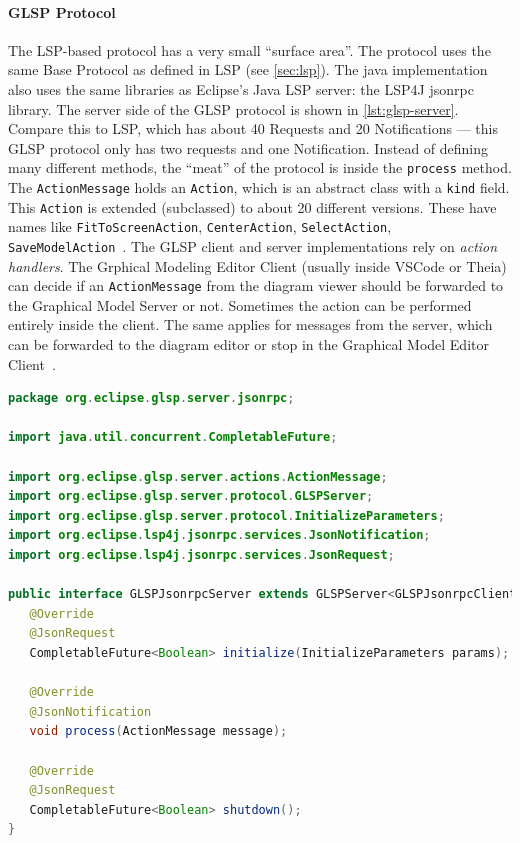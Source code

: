 \paragraph{GLSP Protocol}\label{par:glsp-actionmessage}
The \acrshort{LSP}-based protocol has a very small ``surface area''.
The protocol uses the same Base Protocol as defined in \acrshort{LSP} (see \cref{sec:lsp}).
The java implementation also uses the same libraries as Eclipse's Java \acrshort{LSP} server: the LSP4J jsonrpc library.
The server side of the GLSP protocol is shown in \cref{lst:glsp-server}.
Compare this to \acrshort{LSP}, which has about 40 Requests and 20 Notifications --- this GLSP protocol only has two requests and one Notification.
Instead of defining many different methods, the ``meat'' of the protocol is inside the \texttt{process} method.
The \texttt{ActionMessage} holds an \texttt{Action}, which is an abstract class with a \texttt{kind} field.
This \texttt{Action} is extended (subclassed) to about 20 different versions.
These have names like \texttt{FitToScreenAction}, \texttt{CenterAction}, \texttt{SelectAction}, \texttt{SaveModelAction}~\cite{tobiasortmayrEclipseglspGlspserverActions2021}.
The GLSP client and server implementations rely on \textit{action handlers}.
The Grphical Modeling Editor Client (usually inside \gls{VSCode} or \gls{Theia}) can decide if an \texttt{ActionMessage} from the diagram viewer should be forwarded to the Graphical Model Server or not.
Sometimes the action can be performed entirely inside the client.
The same applies for messages from the server, which can be forwarded to the diagram editor or stop in the Graphical Model Editor Client~\cite{tobiasortmayrEclipseglspGlspvscodeintegration2021}.

\begin{lstlisting}[language=java, label={lst:glsp-server}, caption={[GLSP Server Interface]GLSP Server java interface. Copied from \cite{philiplangerEclipseglspGlspserver2021}.}]
package org.eclipse.glsp.server.jsonrpc;

import java.util.concurrent.CompletableFuture;

import org.eclipse.glsp.server.actions.ActionMessage;
import org.eclipse.glsp.server.protocol.GLSPServer;
import org.eclipse.glsp.server.protocol.InitializeParameters;
import org.eclipse.lsp4j.jsonrpc.services.JsonNotification;
import org.eclipse.lsp4j.jsonrpc.services.JsonRequest;

public interface GLSPJsonrpcServer extends GLSPServer<GLSPJsonrpcClient> {
   @Override
   @JsonRequest
   CompletableFuture<Boolean> initialize(InitializeParameters params);

   @Override
   @JsonNotification
   void process(ActionMessage message);

   @Override
   @JsonRequest
   CompletableFuture<Boolean> shutdown();
}
\end{lstlisting}

